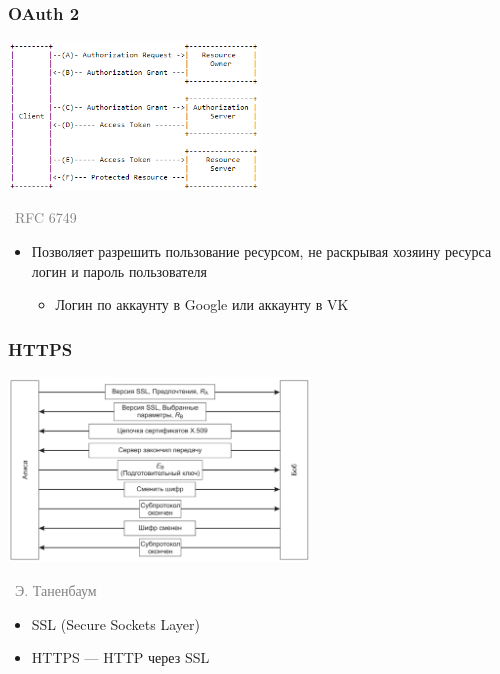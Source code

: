 \documentclass[xetex,mathserif,serif]{beamer}
\newcommand{\attribution}[1] {
\vspace{-5mm}\begin{flushright}\begin{scriptsize}\textcolor{gray}{\textcopyright\, #1}\end{scriptsize}\end{flushright}
}
\begin{document}
	\begin{frame}
		\frametitle{OAuth 2}
		\begin{center}
			\includegraphics[width=0.5\textwidth]{oauth.png}
			\attribution{RFC 6749}
		\end{center}
		\begin{itemize}
			\item Позволяет разрешить пользование ресурсом, не раскрывая хозяину ресурса логин и пароль пользователя
			\begin{itemize}
				\item Логин по аккаунту в Google или аккаунту в VK
			\end{itemize}
		\end{itemize}
	\end{frame}

	\begin{frame}
		\frametitle{HTTPS}
		\begin{center}
			\includegraphics[width=0.6\textwidth]{ssl.png}
			\attribution{Э. Таненбаум}
		\end{center}
		\begin{itemize}
			\item SSL (Secure Sockets Layer)
			\item HTTPS --- HTTP через SSL
		\end{itemize}
	\end{frame}
\end{document}
